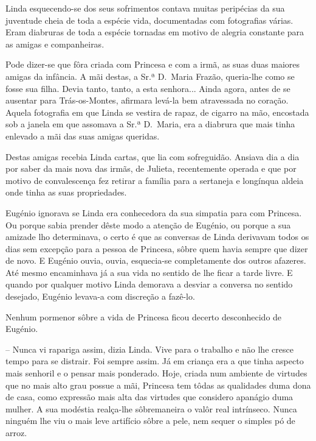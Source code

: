 \documentclass[9pt]{article}
\begin{document}
Linda esquecendo-se dos seus sofrimentos contava muitas peripé\-cias
da sua juventude cheia de toda a espécie vida, documentadas com fotografias várias. Eram
diabruras de toda a espécie tornadas em motivo de alegria constante para
as amigas e companheiras.

Pode dizer-se que fôra criada com Princesa e com a irmã, as suas duas
maiores amigas da infância. A mãi destas, a Sr.ª D.\ Maria Frazão, queria-\-lhe
como se fosse sua fi\-lha. Devia tanto, tanto, a esta senhora... Ainda agora,
antes de se ausentar para Trás-os-Montes, afirmara levá-la bem atravessada
no cora\-ção. Aquela fotografia em que Linda se vestira de rapaz, de cigarro
na mão, encostada sob a janela em que assomava a Sr.ª D.\ Maria, era a diabrura que mais tinha enlevado a mãi das suas amigas queridas.

Destas amigas recebia Linda cartas, que lia com sofreguidão. Ansiava
dia a dia por saber da mais nova das irmãs, de Julieta, recentemente
operada e que por motivo de convalescença fez retirar a fa\-mí\-lia para a sertaneja e longínqua aldeia onde tinha as suas propriedades.

Eugé\-nio ignorava se Linda era conhecedora da sua simpatia para
com Princesa. Ou porque sabia prender dêste modo a aten\-ção de Eugé\-nio,
ou porque a sua amizade lho determinava, o certo é que as conversas de
Linda derivavam todos os dias sem excep\-ção para a pessoa de Princesa,
sôbre quem havia sempre que dizer de novo. E Eugé\-nio ouvia, ouvia, esquecia-se completamente dos outros afazeres. Até mesmo encaminhava
já a sua vida no sentido de lhe fi\-car a tarde livre. E quan\-do por qualquer motivo Linda demorava a desviar a conversa no sentido desejado,
Eugé\-nio levava-a com discre\-ção a fazê-lo.

\newpage %

Nenhum pormenor sôbre a vida de Princesa ficou decerto desconhecido de Eugé\-nio.

-- Nunca vi rapariga assim, dizia Linda. Vive para o traba\-lho e
não lhe cresce tempo para se distrair. Foi sempre assim. Já em crian\-ça era a que tinha aspecto mais senhoril e o pensar mais ponderado.
Hoje, criada num ambiente de virtudes que no mais alto grau possue
a mãi, Princesa tem tôdas as qualidades duma dona de casa, como ex\-pres\-são mais alta das virtudes que considero apanágio duma mu\-lher. A sua
modéstia realça-\-lhe sôbremaneira o valôr real intrínseco. Nunca nin\-guém lhe viu o mais leve artifício sôbre a pele, nem sequer o simples
pó de arroz.
\end{document}
